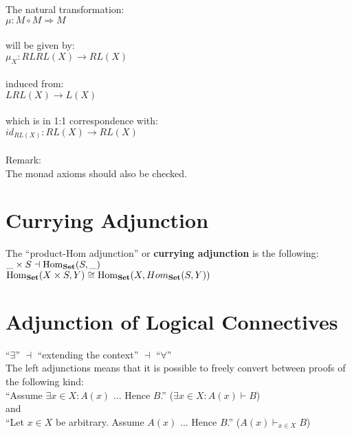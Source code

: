 \documentclass[a4paper, twoside, english, 11pt]{book}
\DeclareMathOperator{\Hom}{Hom}
\newcommand{\catname}[1]{{\normalfont\textbf{#1}}}
\newcommand{\Set}{\catname{Set}}
\begin{document}
\noindent
The natural transformation: \\
\indent
$\mu : M \circ M \Rightarrow M$ \\\\
will be given by: \\
\indent
$\mu_X : RLRL(X) \rightarrow RL(X)$ \\\\
induced from: \\
\indent
$LRL(X) \rightarrow L(X)$ \\\\
which is in 1:1 correspondence with: \\
\indent
$id_{RL(X)} : RL(X) \rightarrow RL(X)$ \\\\

\noindent
Remark: \\
The monad axioms should also be checked.



\section{Currying Adjunction}

The ``product-Hom adjunction'' or \textbf{currying adjunction} is the following: \\

$\_ \times S \dashv \Hom_\Set(S, \_)$ \\

\noindent
$\Hom_\Set(X \times S, Y) \cong \Hom_\Set(X, Hom_\Set(S, Y))$



\section{Adjunction of Logical Connectives}

``$\exists$'' $\dashv$ ``extending the context'' $\dashv$ ``$\forall$'' \\

\noindent
The left adjunctions means that it is possible to freely convert between proofs of the following kind: \\

``Assume $\exists x \in X : A(x)$ ... Hence $B$.'' ($\exists x \in X : A(x) \vdash B$) \\

\noindent
and \\

``Let $x \in X$ be arbitrary. Assume $A(x)$ ... Hence $B$.'' ($A(x) \vdash_{x \in X} B$) \\
\end{document}
